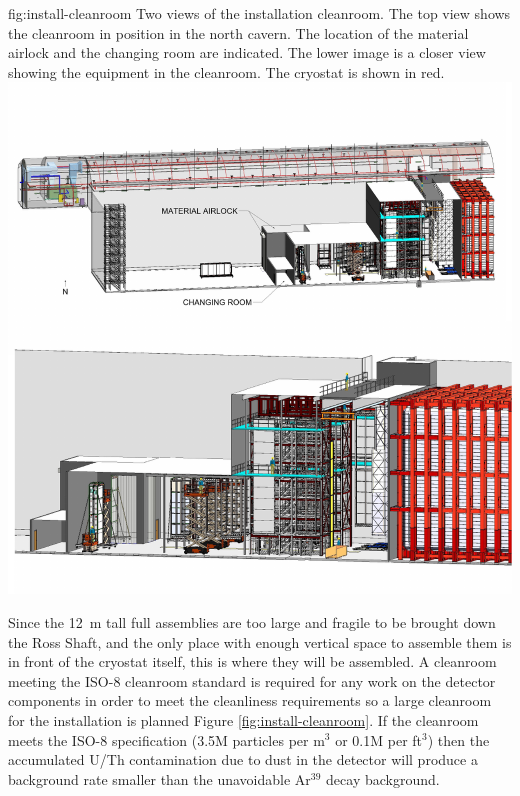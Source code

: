 \begin{dunefigure}{fig:install-cleanroom}
  {Two views of the installation cleanroom.  The top view shows the cleanroom in position in the north cavern. The location of the material airlock and the changing room are indicated. The lower image is a closer view showing the equipment in the cleanroom. The cryostat is shown in red.
  } 
\includegraphics[width=1.0\textwidth]{graphics/install-cleanroom.pdf}
\end{dunefigure}


Since the \SI{12}{m} tall full assemblies are too large and fragile to be brought down the Ross Shaft, and the only place with enough vertical space to assemble them is in front of the cryostat itself, this is where they will be assembled. A cleanroom meeting the ISO-8 cleanroom standard is required for any work on the detector components in order to meet the  cleanliness requirements so a large cleanroom for the installation is planned Figure \ref{fig:install-cleanroom}.   
If the cleanroom meets the ISO-8 specification (3.5M particles per m$^3$ or 0.1M per ft$^3$) then the accumulated U/Th contamination due to dust in the detector will produce a background rate smaller than the unavoidable Ar$^{39}$ decay background.

